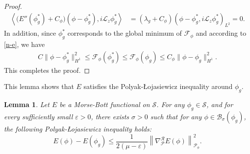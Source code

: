 \documentclass[preprint,3p]{elsarticle}
\newtheorem{lemma}{Lemma}[section]
\begin{document}
\begin{proof}
\begin{align*}
		\left\langle \big(E''(\phi_g^{*})+C_{\phi}\big)(\phi-\phi_g^*),i\mathcal{L}_z\phi_g^*\right\rangle&=\left(\lambda_g+C_{\phi}\right)( \phi-\phi_g^*,i\mathcal{L}_z\phi_g^*)_{L^2}=0.
	\end{align*}
	In addition, since \(\phi_g^*\) corresponds to the global minimum of \(\mathcal{F}_{\phi}\) and according to \eqref{n-e}, we have
	\begin{align*}
		C\big\|\phi-\phi_g^*\big\|^2_{H^1}\le \mathcal{F}_{\phi}(\phi_g^*)\le \mathcal{F}_{\phi}(\phi_g)\le C_{\phi}\|\phi-\phi_g\|^2_{H^1}.
	\end{align*}
	This completes the proof.
\end{proof}

This lemma shows that $E$ satisfies the Polyak-\L ojasiewicz inequality around $\phi_g$.
\begin{lemma}\label{Polyak-Loj}
	Let $E$ be a Morse-Bott functional on $\mathcal{S}$. For any $\phi_g\in\mathcal{S}$, and for every sufficiently small $\varepsilon>0$, there exists $\sigma>0$ such that for any $\phi \in \mathcal{B}_{\sigma}(\phi_g)$, the following Polyak-\L ojasiewicz inequality holds:
	\[
	E(\phi) - E(\phi_g)\leq \frac{1}{2(\mu - \varepsilon)} \left\| \nabla^{\mathcal{R}}_{\mathcal{P}} E(\phi)\right\|^2_{\mathcal{P}_{\phi}}.
	\]
\end{lemma}
\end{document}
